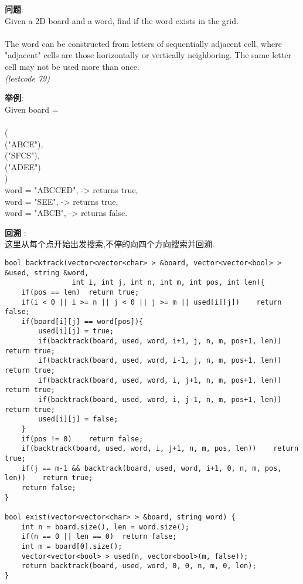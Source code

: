     
\begin{description}
    \item{\textbf{问题}}:\\
Given a 2D board and a word, find if the word exists in the grid.\\
\\
The word can be constructed from letters of sequentially adjacent cell, where "adjacent" cells are those horizontally or vertically neighboring. The same letter cell may not be used more than once.\\
\textit{(leetcode 79)}
    \item{\textbf{举例}}:\\
Given board =\\
\\
(\\
  ("ABCE"),\\
  ("SFCS"),\\
  ("ADEE")\\
)\\
word = "ABCCED", -> returns true,\\
word = "SEE", -> returns true,\\
word = "ABCB", -> returns false.
    \item{\textbf{回溯}} : 
    \\这里从每个点开始出发搜索,不停的向四个方向搜索并回溯.
    \begin{lstlisting}
bool backtrack(vector<vector<char> > &board, vector<vector<bool> > &used, string &word,
				int i, int j, int n, int m, int pos, int len){
	if(pos == len)	return true;
	if(i < 0 || i >= n || j < 0 || j >= m || used[i][j])	return false;
	if(board[i][j] == word[pos]){
		used[i][j] = true;
		if(backtrack(board, used, word, i+1, j, n, m, pos+1, len))	return true;
		if(backtrack(board, used, word, i-1, j, n, m, pos+1, len))	return true;
		if(backtrack(board, used, word, i, j+1, n, m, pos+1, len))	return true;
		if(backtrack(board, used, word, i, j-1, n, m, pos+1, len))	return true;
		used[i][j] = false;
	}
	if(pos != 0)	return false;
	if(backtrack(board, used, word, i, j+1, n, m, pos, len))	return true;
	if(j == m-1 && backtrack(board, used, word, i+1, 0, n, m, pos, len))	return true;
	return false;
}

bool exist(vector<vector<char> > &board, string word) {
	int n = board.size(), len = word.size();
	if(n == 0 || len == 0)	return false;
	int m = board[0].size();
	vector<vector<bool> > used(n, vector<bool>(m, false));
	return backtrack(board, used, word, 0, 0, n, m, 0, len);
}
    \end{lstlisting}
\end{description}
